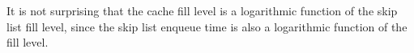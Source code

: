 It is not surprising that the cache fill level is a logarithmic function of the skip list fill level, since the skip list enqueue time is also a logarithmic function of the fill level.








